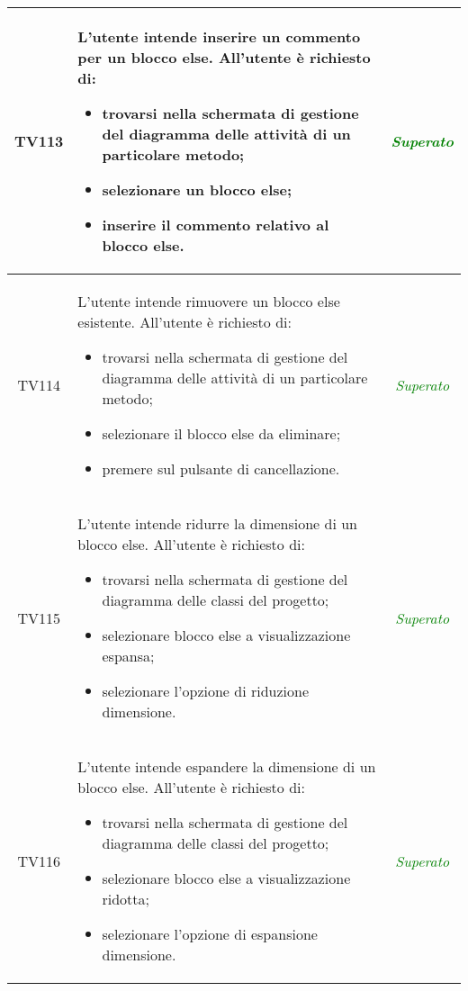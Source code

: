 \begin{longtable}{|c|>{}m{8cm}|c|}
\hypertarget{TV4.31.1}{TV113} & L'utente intende inserire un commento per un blocco else.
All'utente è richiesto di:
\begin{itemize}
	\item trovarsi nella schermata di gestione del diagramma delle attività di un particolare metodo;
	\item selezionare un blocco else;
	\item inserire il commento relativo al blocco else.
\end{itemize} & \textcolor{Green}{\textit{Superato}}\\ \hline

\hypertarget{TV4.32}{TV114} & L'utente intende rimuovere un blocco else esistente.
All'utente è richiesto di:
\begin{itemize}
	\item trovarsi nella schermata di gestione del diagramma delle attività di un particolare metodo;
	\item selezionare il blocco else da eliminare;
	\item premere sul pulsante di cancellazione.
\end{itemize} & \textcolor{Green}{\textit{Superato}}\\ \hline

\hypertarget{TV4.33}{TV115} & L'utente intende ridurre la dimensione di un blocco else.
All'utente è richiesto di:
\begin{itemize}
	\item trovarsi nella schermata di gestione del diagramma delle classi del progetto;
	\item selezionare blocco else a visualizzazione espansa;
	\item selezionare l'opzione di riduzione dimensione.
\end{itemize} & \textcolor{Green}{\textit{Superato}}\\ \hline

\hypertarget{TV4.34}{TV116} & L'utente intende espandere la dimensione di un blocco else.
All'utente è richiesto di:
\begin{itemize}
	\item trovarsi nella schermata di gestione del diagramma delle classi del progetto;
	\item selezionare blocco else a visualizzazione ridotta;
	\item selezionare l'opzione di espansione dimensione.
\end{itemize} & \textcolor{Green}{\textit{Superato}}\\ \hline


\end{longtable}
